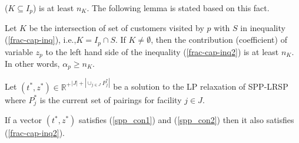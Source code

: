 ($K \subseteq I_p$) is at least $n_K$. The following lemma is stated based on this fact.
\begin{lemma}
\label{contr-p-fc}
Let $K$ be the intersection of set of customers visited by $p$ with $S$ in
inequality (\ref{frac-cap-inq}), i.e.,$K = I_p \cap S$. If $K \neq \emptyset$,
then the contribution (coefficient) of variable $z_p$ to the left hand side of
the inequality (\ref{frac-cap-inq2}) is at least $n_K$. In other words, 
$\alpha_p \geq n_K$.
\end{lemma}
Let $(t^*,z^*) \in {\mathbb{R}^{+}}^{|J|+|\cup_{j \in J}P^*_{j}|}$
be a solution to the LP relaxation of SPP-LRSP where $P^*_{j}$ is the current set
of pairings for facility $j \in J$.
\begin{prop}
If a vector $(t^*,z^*)$ satisfies (\ref{spp_con1}) and (\ref{spp_con2})
then it also satisfies (\ref{frac-cap-inq2}).
\end{prop}
